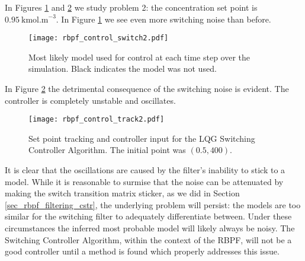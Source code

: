 In Figures \ref{fig_rbpf_control_switch2} and \ref{fig_rbpf_control_track2} we study problem 2: the concentration set point is $0.95~\text{kmol.m}^{-3}$. In Figure \ref{fig_rbpf_control_switch2} we see even more switching noise than before.
\begin{figure}[H] 
\centering
\texttt{[image: rbpf\_control\_switch2.pdf]}
\caption{Most likely model used for control at each time step over the simulation. Black indicates the model was not used.}
\label{fig_rbpf_control_switch2}
\end{figure}
In Figure \ref{fig_rbpf_control_track2} the detrimental consequence of the switching noise is evident. The controller is completely unstable and oscillates.
\begin{figure}[H] 
\centering
\texttt{[image: rbpf\_control\_track2.pdf]}
\caption{Set point tracking and controller input for the LQG Switching Controller Algorithm. The initial point was $(0.5, 400)$.}
\label{fig_rbpf_control_track2}
\end{figure}
It is clear that the oscillations are caused by the filter's inability to stick to a model. While it is reasonable to surmise that the noise can be attenuated by making the switch transition matrix sticker, as we did in Section \ref{sec_rbpf_filtering_cstr}, the underlying problem will persist: the models are too similar for the switching filter to adequately differentiate between. Under these circumstances the inferred most probable model will likely always be noisy. The Switching Controller Algorithm, within the context of the RBPF, will not be a good controller until a method is found which properly addresses this issue.

